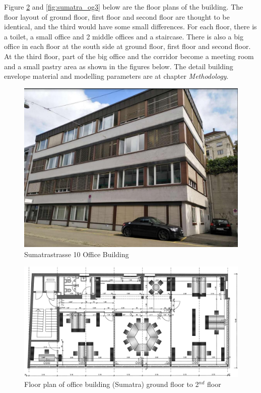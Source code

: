 \documentclass[a4paper, oneside]{discothesis}
\begin{document}
		Figure \ref{fig:sumatra_og2} and \ref{fig:sumatra_og3} below are the floor plans of the building.
		The floor layout of ground floor, first floor and second floor are thought to be identical, and the third would have some small differences. For each floor, there is a toilet, a small office and 2 middle offices and a staircase. There is also a big office in each floor at the south side at ground floor, first floor and second floor. At the third floor, part of the big office and the corridor become a meeting room and a small pastry area as shown in the figures below. The detail building envelope material and modelling parameters are at chapter \textit{Methodology}.

		\begin{figure}[ht]
		\centering
		\includegraphics[scale=0.45]{Sumatra_photo.jpg}
		\caption{Sumatrastrasse 10 Office Building}
		\label{fig:Sumatra_photo}
		\end{figure}
		
		\begin{figure}[ht!]
		  \centering
		  \includegraphics[scale=0.12]{Sumatra_OG2_Plan.pdf}
		  \caption{Floor plan of office building (Sumatra) ground floor to 2$^{nd}$ floor}
		  \label{fig:sumatra_og2}
		 \end{figure}
\end{document}
